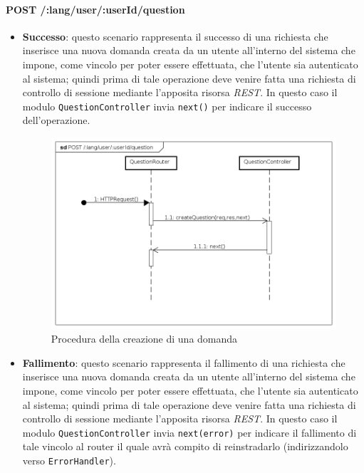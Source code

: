 \paragraph{POST /:lang/user/:userId/question}
\begin{itemize}
\item \textbf{Successo}: questo scenario rappresenta il successo di una richiesta che inserisce una nuova domanda creata da un utente all'interno del sistema che impone, come vincolo per poter essere effettuata, che l'utente sia autenticato al sistema; quindi prima di tale operazione deve venire fatta una richiesta di controllo di sessione mediante l'apposita risorsa \textit{REST}. In questo caso il modulo \texttt{QuestionController} invia \texttt{next()} per indicare il successo dell'operazione.


\begin{figure}[ht]
	\centering
	\includegraphics[scale=0.45]{UML/DiagrammiDiSequenza/Back-end/POST__lang_user__userId_question_success.png}
	\caption{Procedura della creazione di una domanda}
\end{figure}
\FloatBarrier

\item \textbf{Fallimento}: questo scenario rappresenta il fallimento di una richiesta che inserisce una nuova domanda creata da un utente all'interno del sistema che impone, come vincolo per poter essere effettuata, che l'utente sia autenticato al sistema; quindi prima di tale operazione deve venire fatta una richiesta di controllo di sessione mediante l'apposita risorsa \textit{REST}. In questo caso il modulo \texttt{QuestionController} invia \texttt{next(error)} per indicare il fallimento di tale vincolo al router il quale avrà compito di reinstradarlo (indirizzandolo verso \texttt{ErrorHandler}).


\end{itemize}
